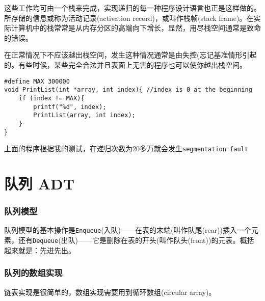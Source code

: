 \documentclass[utf8]{ctexbook}
\begin{document}
这些工作均可由一个栈来完成，实现递归的每一种程序设计语言也正是这样做的。所存储的信息或称为{\kaishu 活动记录}(activation record)，或叫作{\kaishu 栈帧}(stack frame)。在实际计算机中的栈常常是从内存分区的高端向下增长，显然，用尽栈空间通常是致命的错误。

在正常情况下不应该越出栈空间，发生这种情况通常是由失控({\heiti 忘记基准情形}引起的。有些时候，某些完全合法并且表面上无害的程序也可以使你越出栈空间。
\begin{lstlisting}
#define MAX 300000
void PrintList(int *array, int index){ //index is 0 at the beginning
    if (index != MAX){
        printf("%d", index);
        PrintList(array, int index);
    }
}
\end{lstlisting}
上面的程序根据我的测试，在递归次数为20多万就会发生\verb|segmentation fault|
\section{队列 ADT}
\subsubsection{队列模型}
队列模型的基本操作是\verb|Enqueue|(入队)——在表的末端(叫作队尾(rear))插入一个元素，还有\verb|Dequeue|(出队)——它是删除在表的开头(叫作队头(front))的元表。概括起来就是：{\kaishu 先进先出}。
\subsubsection{队列的数组实现}
链表实现是很简单的，数组实现需要用到{\kaishu 循环数组}(circular array)。
\end{document}
